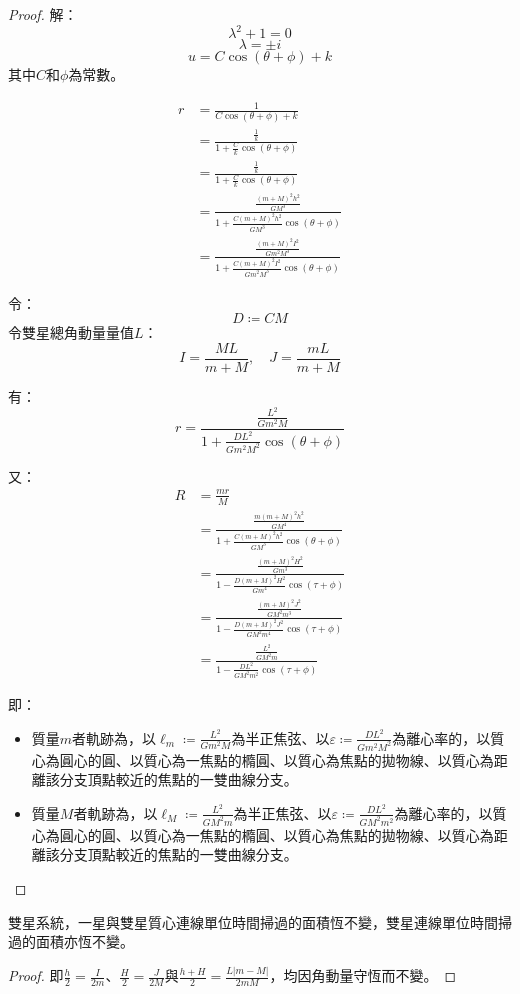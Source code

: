 \documentclass[a4paper,12pt]{article}
\begin{document}
\begin{proof}
解：
\[\lambda^2+1=0\]
\[\lambda=\pm i\]
\[u=C\cos(\theta+\phi)+k\]
其中$C$和$\phi$為常數。

\[\begin{aligned}
r&=\frac{1}{C\cos(\theta+\phi)+k}\\
&=\frac{\frac{1}{k}}{1+\frac{C}{k}\cos(\theta+\phi)}\\
&=\frac{\frac{1}{k}}{1+\frac{C}{k}\cos(\theta+\phi)}\\
&=\frac{\frac{(m+M)^2h^2}{GM^3}}{1+\frac{C(m+M)^2h^2}{GM^3}\cos(\theta+\phi)}\\
&=\frac{\frac{(m+M)^2I^2}{Gm^2M^3}}{1+\frac{C(m+M)^2I^2}{Gm^2M^3}\cos(\theta+\phi)}
\end{aligned}\]

令：
\[D\coloneq CM\]
令雙星總角動量量值$L$：
\[I=\frac{ML}{m+M},\quad J=\frac{mL}{m+M}\]

有：
\[r=\frac{\frac{L^2}{Gm^2M}}{1+\frac{DL^2}{Gm^2M^2}\cos(\theta+\phi)}\]

又：
\[\begin{aligned}
R&=\frac{mr}{M}\\
&=\frac{\frac{m(m+M)^2h^2}{GM^4}}{1+\frac{C(m+M)^2h^2}{GM^3}\cos(\theta+\phi)}\\
&=\frac{\frac{(m+M)^2H^2}{Gm^3}}{1-\frac{D(m+M)^2H^2}{Gm^4}\cos(\tau+\phi)}\\
&=\frac{\frac{(m+M)^2J^2}{GM^2m^3}}{1-\frac{D(m+M)^2J^2}{GM^2m^4}\cos(\tau+\phi)}\\
&=\frac{\frac{L^2}{GM^2m}}{1-\frac{DL^2}{GM^2m^2}\cos(\tau+\phi)}
\end{aligned}\]

即：
\begin{itemize}
\item 質量$m$者軌跡為，以$\ell_m\coloneq \frac{L^2}{Gm^2M}$為半正焦弦、以$\varepsilon\coloneq \frac{DL^2}{Gm^2M^2}$為離心率的，以質心為圓心的圓、以質心為一焦點的橢圓、以質心為焦點的拋物線、以質心為距離該分支頂點較近的焦點的一雙曲線分支。
\item 質量$M$者軌跡為，以$\ell_M\coloneq \frac{L^2}{GM^2m}$為半正焦弦、以$\varepsilon\coloneq \frac{DL^2}{GM^2m^2}$為離心率的，以質心為圓心的圓、以質心為一焦點的橢圓、以質心為焦點的拋物線、以質心為距離該分支頂點較近的焦點的一雙曲線分支。
\end{itemize}
\end{proof}
雙星系統，一星與雙星質心連線單位時間掃過的面積恆不變，雙星連線單位時間掃過的面積亦恆不變。
\begin{proof}
即$\frac{h}{2}=\frac{I}{2m}$、$\frac{H}{2}=\frac{J}{2M}$與$\frac{h+H}{2}=\frac{L|m-M|}{2mM}$，均因角動量守恆而不變。
\end{proof}
\end{document}
